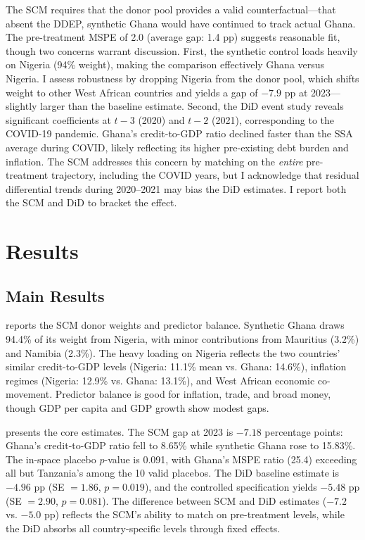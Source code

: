 \documentclass[12pt]{article}
\begin{document}
The SCM requires that the donor pool provides a valid counterfactual---that absent the DDEP, synthetic Ghana would have continued to track actual Ghana. The pre-treatment MSPE of 2.0 (average gap: 1.4 pp) suggests reasonable fit, though two concerns warrant discussion. First, the synthetic control loads heavily on Nigeria (94\% weight), making the comparison effectively Ghana versus Nigeria. I assess robustness by dropping Nigeria from the donor pool, which shifts weight to other West African countries and yields a gap of $-7.9$ pp at 2023---slightly larger than the baseline estimate. Second, the DiD event study reveals significant coefficients at $t-3$ (2020) and $t-2$ (2021), corresponding to the COVID-19 pandemic. Ghana's credit-to-GDP ratio declined faster than the SSA average during COVID, likely reflecting its higher pre-existing debt burden and inflation. The SCM addresses this concern by matching on the \textit{entire} pre-treatment trajectory, including the COVID years, but I acknowledge that residual differential trends during 2020--2021 may bias the DiD estimates. I report both the SCM and DiD to bracket the effect.

\section{Results}

\subsection{Main Results}



 reports the SCM donor weights and predictor balance. Synthetic Ghana draws 94.4\% of its weight from Nigeria, with minor contributions from Mauritius (3.2\%) and Namibia (2.3\%). The heavy loading on Nigeria reflects the two countries' similar credit-to-GDP levels (Nigeria: 11.1\% mean vs. Ghana: 14.6\%), inflation regimes (Nigeria: 12.9\% vs. Ghana: 13.1\%), and West African economic co-movement. Predictor balance is good for inflation, trade, and broad money, though GDP per capita and GDP growth show modest gaps.



 presents the core estimates. The SCM gap at 2023 is $-7.18$ percentage points: Ghana's credit-to-GDP ratio fell to 8.65\% while synthetic Ghana rose to 15.83\%. The in-space placebo $p$-value is 0.091, with Ghana's MSPE ratio (25.4) exceeding all but Tanzania's among the 10 valid placebos. The DiD baseline estimate is $-4.96$ pp (SE $= 1.86$, $p = 0.019$), and the controlled specification yields $-5.48$ pp (SE $= 2.90$, $p = 0.081$). The difference between SCM and DiD estimates ($-7.2$ vs. $-5.0$ pp) reflects the SCM's ability to match on pre-treatment levels, while the DiD absorbs all country-specific levels through fixed effects.
\end{document}
